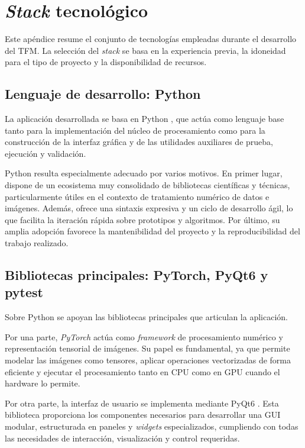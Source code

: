 \section{\textit{Stack} tecnológico} \label{sec:appendix_B_technology_stack}

Este apéndice resume el conjunto de tecnologías empleadas durante el desarrollo
del TFM. La selección del \textit{stack} se basa en la experiencia previa,
la idoneidad para el tipo de proyecto y la disponibilidad de recursos.

\subsection{Lenguaje de desarrollo: Python}

La aplicación desarrollada se basa en Python \cite{python}, que actúa como lenguaje base tanto para
la implementación del núcleo de procesamiento como para la construcción de la
interfaz gráfica y de las utilidades auxiliares de prueba, ejecución y
validación.

Python resulta especialmente adecuado por varios motivos. 
En primer lugar, dispone de un ecosistema muy consolidado de bibliotecas científicas y 
técnicas, particularmente útiles en el contexto de tratamiento numérico de datos e imágenes.
Además, ofrece una sintaxis expresiva y un ciclo de desarrollo ágil, lo que facilita la 
iteración rápida sobre prototipos y algoritmos. Por último, su amplia adopción 
favorece la mantenibilidad del proyecto y la reproducibilidad del trabajo realizado.

\subsection{Bibliotecas principales: PyTorch, PyQt6 y pytest}

Sobre Python se apoyan las bibliotecas principales que articulan la
aplicación.

Por una parte, \textit{PyTorch} \cite{pytorch} actúa como \textit{framework} de
procesamiento numérico y representación tensorial de imágenes. Su papel es fundamental, 
ya que permite modelar las imágenes como tensores,
aplicar operaciones vectorizadas de forma eficiente y ejecutar el
procesamiento tanto en CPU como en GPU cuando el hardware lo permite.

Por otra parte, la interfaz de usuario se implementa mediante
PyQt6 \cite{pyqt6}. Esta biblioteca proporciona los componentes necesarios para
desarrollar una GUI modular, estructurada en paneles y \textit{widgets} especializados,
cumpliendo con todas las necesidades de interacción, visualización y control requeridas.

